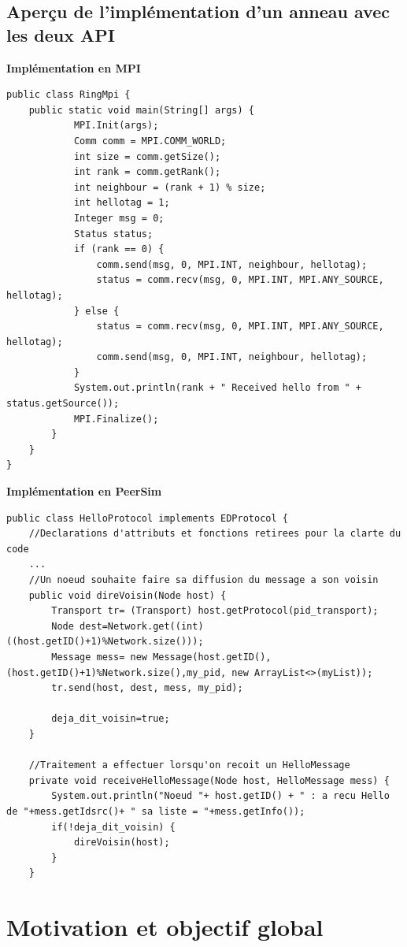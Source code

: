 \documentclass{article}
\begin{document}
			\newpage
			\subsection{Aperçu de l'implémentation d'un anneau avec les deux API}
				{\bfseries Implémentation en MPI}
				\begin{lstlisting}
public class RingMpi {
	public static void main(String[] args) {
			MPI.Init(args);
			Comm comm = MPI.COMM_WORLD;
			int size = comm.getSize();
			int rank = comm.getRank();
			int neighbour = (rank + 1) % size;
			int hellotag = 1;
			Integer msg = 0;
			Status status;
			if (rank == 0) {
				comm.send(msg, 0, MPI.INT, neighbour, hellotag);
				status = comm.recv(msg, 0, MPI.INT, MPI.ANY_SOURCE, hellotag);
			} else {
				status = comm.recv(msg, 0, MPI.INT, MPI.ANY_SOURCE, hellotag);
				comm.send(msg, 0, MPI.INT, neighbour, hellotag);
			}
			System.out.println(rank + " Received hello from " + status.getSource());
			MPI.Finalize();
		}
	}
}
				\end{lstlisting}
				{\bfseries Implémentation en PeerSim}
				\begin{lstlisting}
public class HelloProtocol implements EDProtocol {
	//Declarations d'attributs et fonctions retirees pour la clarte du code
	...
	//Un noeud souhaite faire sa diffusion du message a son voisin
	public void direVoisin(Node host) {
		Transport tr= (Transport) host.getProtocol(pid_transport);
		Node dest=Network.get((int) ((host.getID()+1)%Network.size()));
		Message mess= new Message(host.getID(),(host.getID()+1)%Network.size(),my_pid, new ArrayList<>(myList));
		tr.send(host, dest, mess, my_pid);

		deja_dit_voisin=true;
	}

	//Traitement a effectuer lorsqu'on recoit un HelloMessage
	private void receiveHelloMessage(Node host, HelloMessage mess) {
		System.out.println("Noeud "+ host.getID() + " : a recu Hello de "+mess.getIdsrc()+ " sa liste = "+mess.getInfo());
		if(!deja_dit_voisin) {
			direVoisin(host);
		}
	}
				\end{lstlisting}
		\section{Motivation et objectif global}
\end{document}
